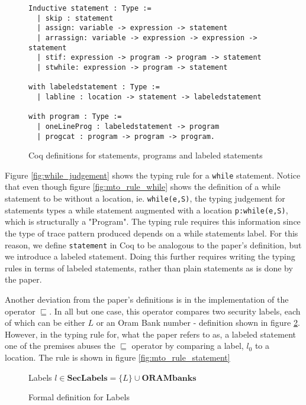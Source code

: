 \documentclass[10pt,  onecolumn]{article}
\begin{document}
\begin{figure}
\caption{Coq definitions for statements, programs and labeled statements}
\label{fig:coq_statements}
\begin{lstlisting}
Inductive statement : Type :=
  | skip : statement
  | assign: variable -> expression -> statement
  | arrassign: variable -> expression -> expression -> statement
  | stif: expression -> program -> program -> statement
  | stwhile: expression -> program -> statement

with labeledstatement : Type :=
  | labline : location -> statement -> labeledstatement

with program : Type :=
  | oneLineProg : labeledstatement -> program
  | progcat : program -> program -> program.
\end{lstlisting}
\end{figure}



Figure \ref{fig:while_judgement} shows the typing rule for a \texttt{while} statement.
Notice that even though figure \ref{fig:mto_rule_while} shows the definition of a while statement to be without a location, ie. \texttt{while(e,S)}, the typing judgement for statements types a while statement augmented with a location \texttt{p:while(e,S)}, which is structurally a "Program".
The typing rule requires this information since the type of trace pattern produced depends on a while statements label.
For this reason, we define \texttt{statement} in Coq to be analogous to the paper's definition, but we introduce a labeled statement.
Doing this further requires writing the typing rules in terms of labeled statements, rather than plain statements as is done by the paper.

Another deviation from the paper's definitions is in the implementation of the operator $\sqsubseteq$.
In all but one case, this operator compares two security labels, each of which can be either $L$ or an Oram Bank number - definition shown in figure \ref{fig:mto_labeldef}.
However, in the typing rule for, what the paper refers to as, a labeled statement one of the premises abuses the $\sqsubseteq$ operator by comparing a label, $l_{0}$ to a location. The rule is shown in figure \ref{fig:mto_rule_statement}

\begin{figure}
\caption{Formal definition for Labels}
\label{fig:mto_labeldef}
	\begin{mdframed}
	Labels $l \in \textbf{SecLabels} = \{L\} \cup \textbf{ORAMbanks}$
	\end{mdframed}
\end{figure}
\end{document}
